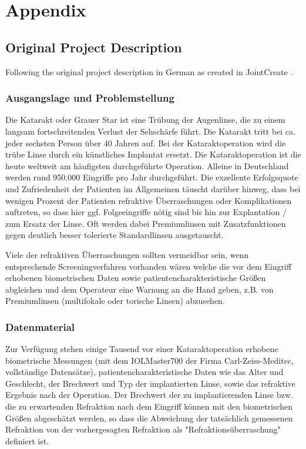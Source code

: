 \part*{Appendix}
\chapter{Original Project Description}\label{app:original_project_description}
Following the original project description in German as created in JointCreate .

\section{Ausgangslage und Problemstellung}
Die Katarakt oder Grauer Star ist eine Trübung der Augenlinse, die zu einem langsam fortschreitenden Verlust der Sehschärfe führt. Die Katarakt tritt bei ca. jeder sechsten Person über 40 Jahren auf. Bei der Kataraktoperation wird die trübe Linse durch ein künstliches Implantat ersetzt. Die Kataraktoperation ist die heute weltweit am häufigsten durchgeführte Operation. Alleine in Deutschland werden rund 950.000 Eingriffe pro Jahr durchgeführt. Die exzellente Erfolgsquote und Zufriedenheit der Patienten im Allgemeinen täuscht darüber hinweg, dass bei wenigen Prozent der Patienten refraktive Überraschungen oder Komplikationen auftreten, so dass hier ggf. Folgeeingriffe nötig sind bis hin zur Explantation / zum Ersatz der Linse. Oft werden dabei Premiumlinsen mit Zusatzfunktionen gegen deutlich besser tolerierte Standardlinsen ausgetauscht.

Viele der refraktiven Überraschungen sollten vermeidbar sein, wenn entsprechende Screeningverfahren vorhanden wären welche die vor dem Eingriff erhobenen biometrischen Daten sowie patientencharakteristische Größen abgleichen und dem Operateur eine Warnung an die Hand geben, z.B. von Premiumlinsen (multifokale oder torische Linsen) abzusehen.

\section{Datenmaterial}
Zur Verfügung stehen einige Tausend vor einer Kataraktoperation erhobene biometrische Messungen (mit dem IOLMaster700 der Firma Carl-Zeiss-Meditec, vollständige Datensätze), patientencharakteristische Daten wie das Alter und Geschlecht, der Brechwert und Typ der implantierten Linse, sowie das refraktive Ergebnis nach der Operation. Der Brechwert der zu implantierenden Linse bzw. die zu erwartenden Refraktion nach dem Eingriff können mit den biometrischen Größen abgeschätzt werden, so dass die Abweichung der tatsächlich gemessenen Refraktion von der vorhergesagten Refraktion als "Refraktionsüberraschung" definiert ist.

